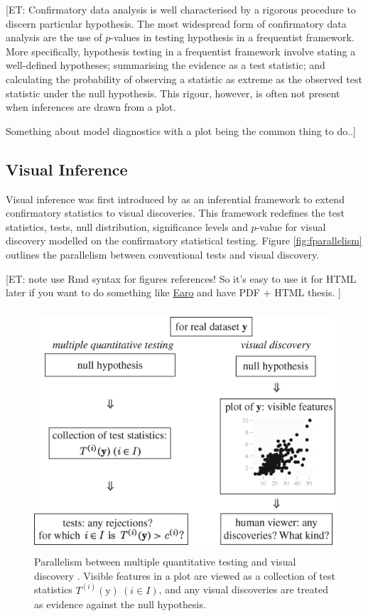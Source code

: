 \documentclass{monashthesis}
\theoremstyle{definition}
\theoremstyle{definition}
\theoremstyle{definition}
\theoremstyle{definition}
\theoremstyle{remark}
\begin{document}
{[}ET: Confirmatory data analysis is well characterised by a rigorous procedure to discern particular hypothesis. The most widespread form of confirmatory data analysis are the use of \(p\)-values in testing hypothesis in a frequentist framework. More specifically, hypothesis testing in a frequentist framework involve stating a well-defined hypotheses; summarising the evidence as a test statistic; and calculating the probability of observing a statistic as extreme as the observed test statistic under the null hypothesis. This rigour, however, is often not present when inferences are drawn from a plot.

Something about model diagnostics with a plot being the common thing to do..{]}

\hypertarget{visual-inference-1}{%
\subsection{Visual Inference}\label{visual-inference-1}}

Visual inference was first introduced by \textcite{buja_statistical_2009} as an inferential framework to extend confirmatory statistics to visual discoveries. This framework redefines the test statistics, tests, null distribution, significance levels and \(p\)-value for visual discovery modelled on the confirmatory statistical testing. Figure \ref{fig:fparallelism} outlines the parallelism between conventional tests and visual discovery.

{[}ET: note use Rmd syntax for figures references! So it's easy to use it for HTML later if you want to do something like \href{https://github.com/earowang/thesis}{Earo} and have PDF + HTML thesis. {]}

\begin{figure}
\centering
\includegraphics[width=4.6875in,height=3.55208in]{figures/rsta2009012001.jpg}
\caption{Parallelism between multiple quantitative testing and visual discovery \autocite{buja_statistical_2009}. Visible features in a plot are viewed as a collection of test statistics \(T^{(i)}(\boldsymbol{\mathrm{y}})~(i \in I)\), and any visual discoveries are treated as evidence against the null hypothesis. \label{fig:parallelism}}
\end{figure}
\end{document}
